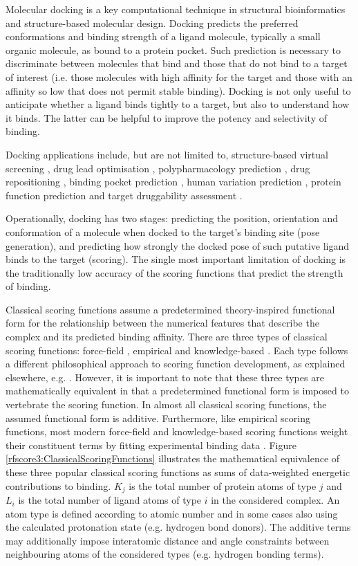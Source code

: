 Molecular docking is a key computational technique in structural bioinformatics and structure-based molecular design. Docking predicts the preferred conformations and binding strength of a ligand molecule, typically a small organic molecule, as bound to a protein pocket. Such prediction is necessary to discriminate between molecules that bind and those that do not bind to a target of interest (i.e. those molecules with high affinity for the target and those with an affinity so low that does not permit stable binding). Docking is not only useful to anticipate whether a ligand binds tightly to a target, but also to understand how it binds. The latter can be helpful to improve the potency and selectivity of binding.

Docking applications include, but are not limited to, structure-based virtual screening \citep{455,1383,1448}, drug lead optimisation \citep{1385}, polypharmacology prediction \citep{1449,1450}, drug repositioning \citep{1384}, binding pocket prediction \citep{384,1217}, human variation prediction \citep{1451}, protein function prediction \citep{1386} and target druggability assessment \citep{1472}.

Operationally, docking has two stages: predicting the position, orientation and conformation of a molecule when docked to the target's binding site (pose generation), and predicting how strongly the docked pose of such putative ligand binds to the target (scoring).  The single most important limitation of docking is the traditionally low accuracy of the scoring functions that predict the strength of binding.

Classical scoring functions assume a predetermined theory-inspired functional form for the relationship between the numerical features that describe the complex and its predicted binding affinity. There are three types of classical scoring functions: force-field \citep{1461,1462,959}, empirical \citep{1463,1464,1465,1466} and knowledge-based \citep{1467,1468,1469,1470}. Each type follows a different philosophical approach to scoring function development, as explained elsewhere, e.g. \citep{579}. However, it is important to note that these three types are mathematically equivalent in that a predetermined functional form is imposed to vertebrate the scoring function. In almost all classical scoring functions, the assumed functional form is additive. Furthermore, like empirical scoring functions, most modern force-field and knowledge-based scoring functions weight their constituent terms by fitting experimental binding data \citep{579}. Figure \ref{rfscore3:ClassicalScoringFunctions} illustrates the mathematical equivalence of these three popular classical scoring functions as sums of data-weighted energetic contributions to binding. $K_j$ is the total number of protein atoms of type $j$ and $L_i$ is the total number of ligand atoms of type $i$ in the considered complex. An atom type is defined according to atomic number and in some cases also using the calculated protonation state (e.g. hydrogen bond donors). The additive terms may additionally impose interatomic distance and angle constraints between neighbouring atoms of the considered types (e.g. hydrogen bonding terms).

